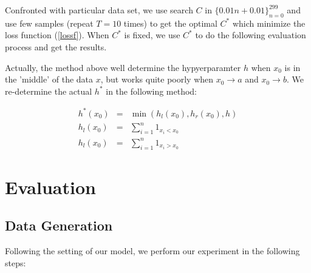 \documentclass[twoside]{article}
\begin{document}
Confronted with particular data set, we use search $C$ in $\{0.01n+0.01\}_{n=0}^{299}$ and use few samples (repeat $T=10$ times) to get the optimal $C^*$ which minimize the loss function (\ref{lossf}). When $C^*$ is fixed, we use $C^*$ to do the following evaluation process and get the results.

Actually, the method above well determine the hypyerparamter $h$ when $x_0$ is in the 'middle' of the data $x$, but works quite poorly when $x_0 \to a$ and $x_0 \to b$. We re-determine the actual $h^*$ in the following method:

\begin{eqnarray}
\label{msef}
  h^*(x_0) &=& \min(h_l(x_0), h_r(x_0), h)\\
  h_l(x_0) &=& \sum_{i=1}^n{1_{x_i<x_0}}\\
  h_l(x_0) &=& \sum_{i=1}^n{1_{x_i>x_0}}
\end{eqnarray}

\section{Evaluation}

\subsection{Data Generation}

\label{process}

Following the setting of our model, we perform our experiment in the following steps:
\end{document}
